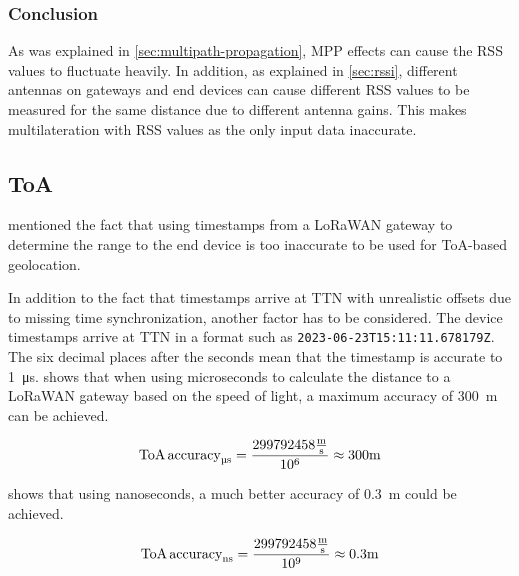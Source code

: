 
\subsubsection{Conclusion}

As was explained in \cref{sec:multipath-propagation}, \acl{MPP} effects can cause the \ac{RSS} values to fluctuate heavily.
In addition, as explained in \cref{sec:rssi}, different antennas on gateways and end devices can cause different \ac{RSS} values to be measured for the same distance due to different antenna gains.
This makes multilateration with \ac{RSS} values as the only input data inaccurate.

\subsection{\acf{ToA}}\label{subsec:conclusion-toa-tdoa}

 mentioned the fact that using timestamps from a \ac{LoRaWAN} gateway to determine the range to the end device is too inaccurate to be used for \ac{ToA}-based geolocation.

In addition to the fact that timestamps arrive at \ac{TTN} with unrealistic offsets due to missing time synchronization, another factor has to be considered.
The device timestamps arrive at \ac{TTN} in a format such as \texttt{2023-06-23T15:11:11.678179Z}.
The six decimal places after the seconds mean that the timestamp is accurate to \SI{1}{\micro\second}.
 shows that when using microseconds to calculate the distance to a \ac{LoRaWAN} gateway based on the speed of light, a maximum accuracy of \SI{300}{\meter} can be achieved.

\begin{equation}\label{eq:toa-accuracy-ttn-microseconds}
    \text{ToA\,accuracy}_{\si{\micro\second}} = \frac{299792458 \frac{\si{\meter}}{\si{\second}}}{10^6} \approx 300 \si{\meter}
\end{equation}

 shows that using nanoseconds, a much better accuracy of \SI{0.3}{\meter} could be achieved.

\begin{equation}\label{eq:toa-accuracy-ttn-nanoseconds}
    \text{ToA\,accuracy}_{\si{\nano\second}} = \frac{299792458 \frac{\si{\meter}}{\si{\second}}}{10^9} \approx 0.3 \si{\meter}
\end{equation}

